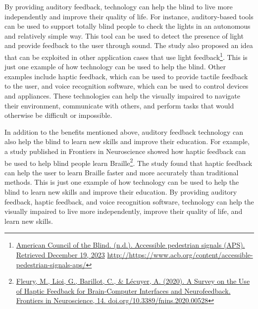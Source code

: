By providing auditory feedback, technology can help the blind to live more independently and improve their quality of life. For instance, auditory-based tools can be used to support totally blind people to check the lights in an autonomous and relatively simple way\footnotemark[\value{footnote}]. This tool can be used to detect the presence of light and provide feedback to the user through sound. The study also proposed an idea that can be exploited in other application cases that use light feedback\footnote{\raggedright \href{http://https://www.acb.org/content/accessible-pedestrian-signals-aps/}{American Council of the Blind. (n.d.). Accessible pedestrian signals (APS). Retrieved December 19, 2023} \url{http://https://www.acb.org/content/accessible-pedestrian-signals-aps/}}. This is just one example of how technology can be used to help the blind. Other examples include haptic feedback, which can be used to provide tactile feedback to the user, and voice recognition software, which can be used to control devices and appliances. These technologies can help the visually impaired to navigate their environment, communicate with others, and perform tasks that would otherwise be difficult or impossible.

In addition to the benefits mentioned above, auditory feedback technology can also help the blind to learn new skills and improve their education. For example, a study published in Frontiers in Neuroscience showed how haptic feedback can be used to help blind people learn Braille\footnote{\raggedright \href{http://www.frontiersin.org/articles/10.3389/fnins.2020.00528/full}{Fleury, M., Lioi, G., Barillot, C., \& Lécuyer, A. (2020). A Survey on the Use of Haptic Feedback for Brain-Computer Interfaces and Neurofeedback. Frontiers in Neuroscience, 14. doi.org/10.3389/fnins.2020.00528}}. The study found that haptic feedback can help the user to learn Braille faster and more accurately than traditional methods. This is just one example of how technology can be used to help the blind to learn new skills and improve their education. By providing auditory feedback, haptic feedback, and voice recognition software, technology can help the visually impaired to live more independently, improve their quality of life, and learn new skills.

